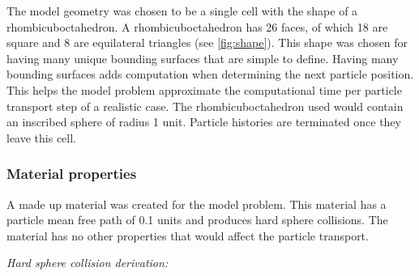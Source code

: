 \documentclass{mc2015}
\begin{document}
The model geometry was chosen to be a single cell with the shape of a rhombicuboctahedron.
A rhombicuboctahedron has 26 faces,
of which 18 are square and 8 are equilateral triangles (see \autoref{fig:shape}).
This shape was chosen for having many unique bounding surfaces that are simple to define.
Having many bounding surfaces adds computation
when determining the next particle position.
This helps the model problem approximate the computational time
per particle transport step of a realistic case.
The rhombicuboctahedron used would contain an inscribed sphere of radius 1 unit.
Particle histories are terminated once they leave this cell.

\subsubsection{Material properties}

A made up material was created for the model problem.
This material has a particle mean free path of 0.1 units and produces
hard sphere collisions.
The material has no other properties that would affect the particle transport.

\noindent
\emph{Hard sphere collision derivation:}
\end{document}
